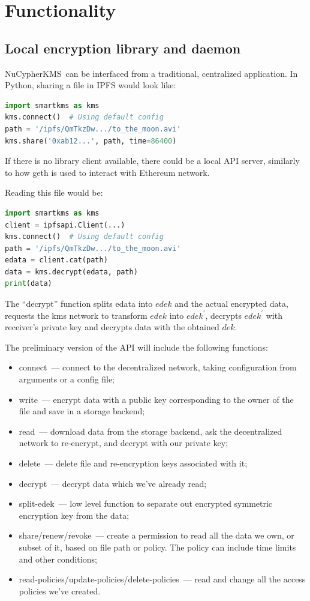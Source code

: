 \documentclass[notitlepage,longbibliography]{revtex4-1}
\newcommand{\kms}{NuCypherKMS}
\begin{document}
\section{Functionality}

\subsection{Local encryption library and daemon}

\kms~can be interfaced from a traditional, centralized application.
In Python, sharing a file in IPFS would look like:
\begin{lstlisting}[frame=single,language=Python]
import smartkms as kms
kms.connect()  # Using default config
path = '/ipfs/QmTkzDw.../to_the_moon.avi'
kms.share('0xab12...', path, time=86400)
\end{lstlisting}
If there is no library client available, there could be a local API server, similarly to how geth is used to interact with Ethereum network.

Reading this file would be:
\begin{lstlisting}[frame=single,language=Python]
import smartkms as kms
client = ipfsapi.Client(...)
kms.connect()  # Using default config
path = '/ipfs/QmTkzDw.../to_the_moon.avi'
edata = client.cat(path)
data = kms.decrypt(edata, path)
print(data)
\end{lstlisting}
The ``decrypt'' function splits edata into $edek$ and the actual encrypted data,
requests the kms network to transform $edek$ into $edek^{\prime}$,
decrypts $edek^{\prime}$ with receiver's private key and
decrypts data with the obtained $dek$.

The preliminary version of the API will include the following functions:
\begin{itemize}
    \item connect~--- connect to the decentralized network,
        taking configuration from arguments or a config file;
    \item write~--- encrypt data with a public key corresponding to the owner of the file and save in a storage backend;
    \item read~--- download data from the storage backend, ask the decentralized network to re-encrypt, and decrypt with our private key;
    \item delete~--- delete file and re-encryption keys associated with it;
    \item decrypt~--- decrypt data which we've already read;
    \item split-edek~--- low level function to separate out encrypted symmetric encryption key from the data;
    \item share/renew/revoke~--- create a permission to read all the data we own, or subset of it, based on file path or policy.
        The policy can include time limits and other conditions;
    \item read-policies/update-policies/delete-policies~--- read and change all the access policies we've created.
\end{itemize}
\end{document}
